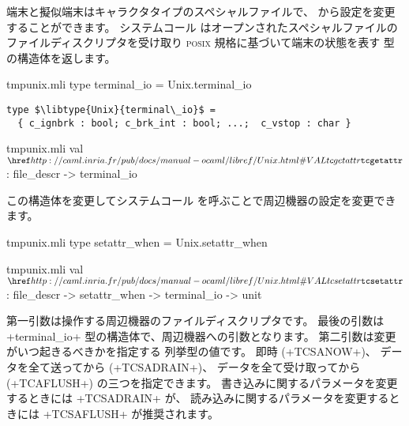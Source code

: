 端末と擬似端末はキャラクタタイプのスペシャルファイルで、 \ocaml から設定を変更することができます。
システムコール  はオープンされたスペシャルファイルのファイルディスクリプタを受け取り
\textsc{posix} 規格に基づいて端末の状態を表す  型の構造体を返します。
%
\begin{codefile}{tmpunix.mli}
type terminal_io = Unix.terminal_io
\end{codefile}
%
\begin{lstlisting}
type $\libtype{Unix}{terminal\_io}$ =
  { c_ignbrk : bool; c_brk_int : bool; ...;  c_vstop : char }
\end{lstlisting}
%
\begin{listingcodefile}{tmpunix.mli}
val $\libvalue{Unix}{tcgetattr}$ : file_descr -> terminal_io
\end{listingcodefile}
%
この構造体を変更してシステムコール  を呼ぶことで周辺機器の設定を変更できます。
%
\begin{codefile}{tmpunix.mli}
type setattr_when = Unix.setattr_when
\end{codefile}
%
\begin{listingcodefile}{tmpunix.mli}
val $\libvalue{Unix}{tcsetattr}$ : file_descr -> setattr_when -> terminal_io -> unit
\end{listingcodefile}
%

第一引数は操作する周辺機器のファイルディスクリプタです。
最後の引数は \ml+terminal_io+ 型の構造体で、周辺機器への引数となります。
第二引数は変更がいつ起きるべきかを指定する  列挙型の値です。
即時 (\ml+TCSANOW+)、 データを全て送ってから (\ml+TCSADRAIN+)、 データを全て受け取ってから (\ml+TCAFLUSH+) の三つを指定できます。
書き込みに関するパラメータを変更するときには \ml+TCSADRAIN+ が、
読み込みに関するパラメータを変更するときには \ml+TCSAFLUSH+ が推奨されます。

